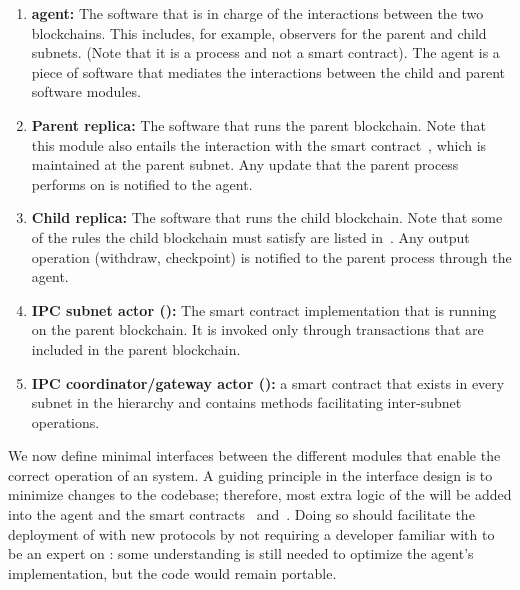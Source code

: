 \begin{enumerate}
    \item \textbf{\ipc agent:} The software that is in charge of the interactions between the two blockchains. This includes, for example, observers for the parent and child subnets. (Note that it is a process and not a smart contract). The \ipc agent is a piece of software that mediates the interactions between the child and parent \smr software modules.    
    \item \textbf{Parent \smr replica:} The software that runs the parent blockchain. Note that this module also entails the interaction with the \ipc smart contract~\sa, which is maintained at the parent subnet. Any update that the parent process performs on \sa is notified to the \ipc agent.
    \item \textbf{Child \smr replica:} The software that runs the child blockchain. Note that some of the rules the child blockchain must satisfy are listed in~\sa. Any output operation (withdraw, checkpoint) is notified to the parent process through the \ipc agent. 
    \item \textbf{IPC subnet actor (\sa):} The smart contract implementation that is running on the parent blockchain. It is invoked only through transactions that are included in the parent blockchain.
    \item \textbf{IPC coordinator/gateway actor (\gw):} a smart contract that exists in every subnet in the \ipc hierarchy and contains methods facilitating inter-subnet operations.	
\end{enumerate}


We now define minimal interfaces between the different modules that enable the correct operation of an \ipcFull system.
A guiding principle in the interface design is to minimize changes to the \smr codebase; therefore, most extra logic of the \ipc will be added into the \ipc agent and the smart contracts \sa~and~\gw. Doing so should facilitate the deployment of \ipc with new \smr protocols by not requiring a developer familiar with \ipc to be an expert on \smr: some understanding is still needed to optimize the agent's implementation, but the \smr code would remain portable.

